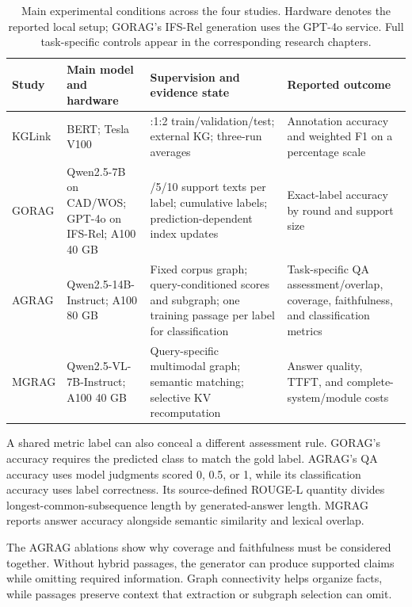 \begin{table}[tbp]
\centering\small
\caption{Main experimental conditions across the four studies. Hardware denotes the reported local setup; GORAG's IFS-Rel generation uses the GPT-4o service. Full task-specific controls appear in the corresponding research chapters.}
\label{tab:discussion:controls}
\begin{tabular}{>{\raggedright\arraybackslash}p{}>{\raggedright\arraybackslash}p{}>{\raggedright\arraybackslash}p{}>{\raggedright\arraybackslash}p{}}
\toprule
Study & Main model and hardware & Supervision and evidence state & Reported outcome\\
\midrule
KGLink & BERT; Tesla V100 & 7:1:2 train/validation/test; external KG; three-run averages & Annotation accuracy and weighted F1 on a percentage scale\\
GORAG & Qwen2.5-7B on CAD/WOS; GPT-4o on IFS-Rel; A100 40 GB & 1/5/10 support texts per label; cumulative labels; prediction-dependent index updates & Exact-label accuracy by round and support size\\
AGRAG & Qwen2.5-14B-Instruct; A100 80 GB & Fixed corpus graph; query-conditioned scores and subgraph; one training passage per label for classification & Task-specific QA assessment/overlap, coverage, faithfulness, and classification metrics\\
MGRAG & Qwen2.5-VL-7B-Instruct; A100 40 GB & Query-specific multimodal graph; semantic matching; selective KV recomputation & Answer quality, TTFT, and complete-system/module costs\\
\bottomrule
\end{tabular}
\end{table}

\begin{samepage}
A shared metric label can also conceal a different assessment rule. GORAG's accuracy requires the predicted class to match the gold label. AGRAG's QA accuracy uses model judgments scored 0, 0.5, or 1, while its classification accuracy uses label correctness. Its source-defined ROUGE-L quantity divides longest-common-subsequence length by generated-answer length. MGRAG reports answer accuracy alongside semantic similarity and lexical overlap.\par
\end{samepage}

The AGRAG ablations show why coverage and faithfulness must be considered together. Without hybrid passages, the generator can produce supported claims while omitting required information. Graph connectivity helps organize facts, while passages preserve context that extraction or subgraph selection can omit.

